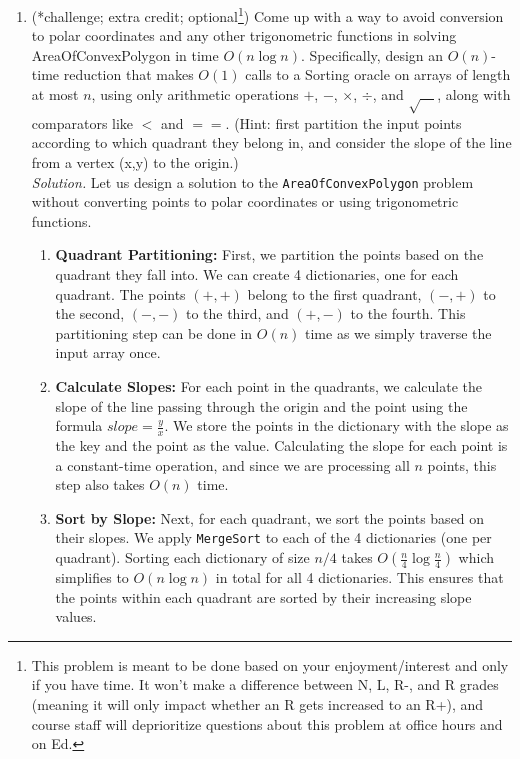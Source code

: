 \documentclass[11pt]{article}
\begin{document}
\begin{enumerate}
\begin{enumerate}
        \item (*challenge; extra credit; optional\footnote{This problem is meant to be done based on your enjoyment/interest and only if you have time. It won't make a difference between N, L, R-, and R grades (meaning it will only impact whether an R gets increased to an R+), and course staff will deprioritize questions about this problem at office hours and on Ed.})  Come up with a way to avoid conversion to polar coordinates and any other trigonometric functions in solving AreaOfConvexPolygon in time $O(n\log n)$.  Specifically, design an $O(n)$-time reduction that makes $O(1)$ calls to a Sorting oracle on arrays of length at most $n$, using only arithmetic operations $+$, $-$, $\times$, $\div$, and $\sqrt{\hspace{1em}}$, along with comparators like $<$ and $==$.  (Hint: first partition the input points according to which quadrant they belong in, and consider the slope of the line from a vertex (x,y) to the origin.) \label{part:nopolar} \\
        \textit{Solution.} Let us design a solution to the \texttt{AreaOfConvexPolygon} problem without converting points to polar coordinates or using trigonometric functions. 

        \begin{enumerate}
            \item \textbf{Quadrant Partitioning:} First, we partition the points based on the quadrant they fall into. We can create 4 dictionaries, one for each quadrant. The points $(+, +)$ belong to the first quadrant, $(-, +)$ to the second, $(-, -)$ to the third, and $(+, -)$ to the fourth. This partitioning step can be done in $O(n)$ time as we simply traverse the input array once.
            
            \item \textbf{Calculate Slopes:} For each point in the quadrants, we calculate the slope of the line passing through the origin and the point using the formula $slope = \frac{y}{x}$. We store the points in the dictionary with the slope as the key and the point as the value. Calculating the slope for each point is a constant-time operation, and since we are processing all $n$ points, this step also takes $O(n)$ time.
            
            \item \textbf{Sort by Slope:} Next, for each quadrant, we sort the points based on their slopes. We apply \texttt{MergeSort} to each of the 4 dictionaries (one per quadrant). Sorting each dictionary of size $n/4$ takes $O\left(\frac{n}{4} \log \frac{n}{4}\right)$ which simplifies to $O(n \log n)$ in total for all 4 dictionaries. This ensures that the points within each quadrant are sorted by their increasing slope values.
            

\end{enumerate}
\end{enumerate}
\end{enumerate}
\end{document}
